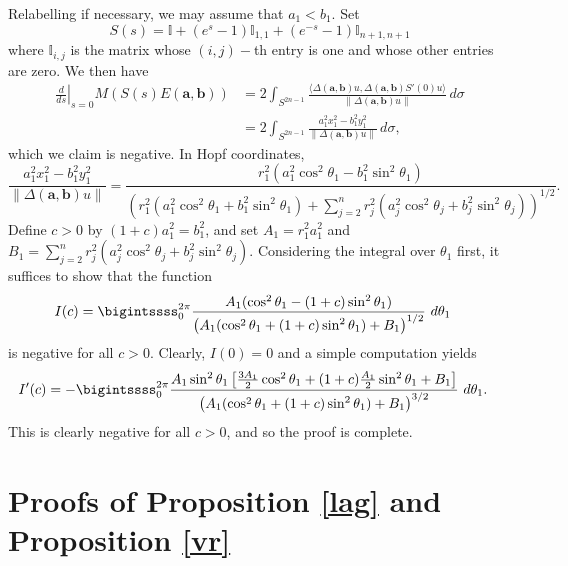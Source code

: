 \documentclass[12pt]{amsart}
\theoremstyle{definition}
\newcommand{\II}{{\mathbb I}}
\begin{document}
 Relabelling if necessary, we may assume that $a_1 < b_1$. Set $$S(s) = \II + (e^s-1)\II_{1,1}+(e^{-s}-1)\II_{n+1,n+1}$$ where $\II_{i,j}$ is the matrix whose $(i,j)-$th entry is one and whose other entries are zero. We then have 
 \begin{align*}
    \left.\frac{d}{ds}\right|_{s=0} M(S(s) E(\mathbf{a},\mathbf{b})) &= 2\int_{S^{2n-1}} \frac{\langle \Delta(\mathbf{a}, \mathbf{b})u, \Delta(\mathbf{a}, \mathbf{b}) S'(0) u \rangle }{\|\Delta(\mathbf{a}, \mathbf{b})u\|}\,d\sigma \\&= 2\int_{S^{2n-1}} \frac{a_1^2x_1^2-b_1^2y_1
^2 }{\|\Delta(\mathbf{a}, \mathbf{b})u\|}\,d\sigma,
\end{align*}
which we claim is negative. In Hopf coordinates,
$$\frac{a_1^2x_1^2-b_1^2y_1
^2 }{\|\Delta(\mathbf{a}, \mathbf{b})u\|} = \frac{r_1^2(a_1^2\cos^2\theta_1- b_1^2\sin^2\theta_1)}{\left(r_1^2(a_1^2\cos^2\theta_1+ b_1^2\sin^2\theta_1)+\sum_{j = 2}^n r_j^2(a_j^2\cos^2\theta_j+ b_j^2\sin^2\theta_j) \right)^{1/2}}.$$
Define $c>0$ by $(1+c)a_1^2 = b_1^2$, and set $A_1= r_1^2a_1^2$ and $B_1 = \sum_{j =2}^n r_j^2(a_j^2\cos^2\theta_j+ b_j^2\sin^2\theta_j)$. Considering the integral over  $\theta_1$ first, it suffices to show that the function
\begin{align*}
    I(c) 
    &= \bigintssss_0^{2 \pi} \frac{A_1(\cos^2\theta_1- (1+c)\sin^2\theta_1)}{\left(A_1(\cos^2\theta_1+ (1+c)\sin^2\theta_1)+B_1 \right)^{1/2}} \,\, d \theta_1
\end{align*}
 is negative for all $c>0$. Clearly, $I(0)=0$ and a simple computation yields  
\begin{align*}
    I'(c) &= -\bigintssss_0^{2 \pi} \frac{A_1 \sin^2\theta_1\left[\frac{3A_1}{2}\cos^2\theta_1+ (1+c)\frac{A_1}{2}\sin^2\theta_1+B_1\right]}{\left(A_1(\cos^2\theta_1+ (1+c)\sin^2\theta_1)+B_1 \right)^{3/2}} \,\, d \theta_1.
\end{align*}
This is clearly negative for all $c>0$, and so the proof is complete. 




\section{Proofs of Proposition \ref{lag} and Proposition \ref{vr}}\label{sec:lag}
\end{document}
